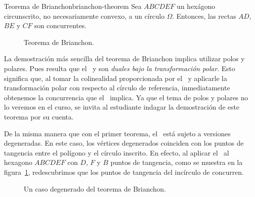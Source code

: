 \begin{section-theorem.tcb}{Teorema de Brianchon}{brianchon-theorem}
    Sea $ABCDEF$ un hexágono circunscrito, no necesariamente convexo, a un círculo $\Omega$.
    Entonces, las rectas $AD$, $BE$ y $CF$ son concurrentes.
\end{section-theorem.tcb}

\begin{figure}[H]
    \centering
    
    \caption{Teorema de Brianchon.}
\end{figure}

La demostración más sencilla del teorema de Brianchon implica utilizar polos y polares.
Pues resulta que el~ y  son \textit{duales bajo la transformación polar}.
Esto significa que, al tomar la colinealidad proporcionada por el~ y aplicarle la transformación polar con respecto al círculo de referencia, inmediatamente obtenemos la concurrencia que el~ implica.
Ya que el tema de polos y polares no lo veremos en el curso, se invita al estudiante indagar la demostración de este teorema por su cuenta.

De la misma manera que con el primer teorema, el~ está sujeto a versiones degeneradas.
En este caso, los vértices degenerados coinciden con los puntos de tangencia entre el polígono y el círculo inscrito.
En efecto, al aplicar el~ al hexagono $ABCDEF$ con $D$, $F$ y $B$ puntos de tangencia, como se muestra en la figura~\ref{fig:case-briancho-theorem}, redescubrimos que los puntos de tangencia del incírculo de  concurren.

\begin{figure}[H]
    \centering
    
    \caption{Un caso degenerado del teorema de Brianchon.}
    \label{fig:case-briancho-theorem}
\end{figure}

